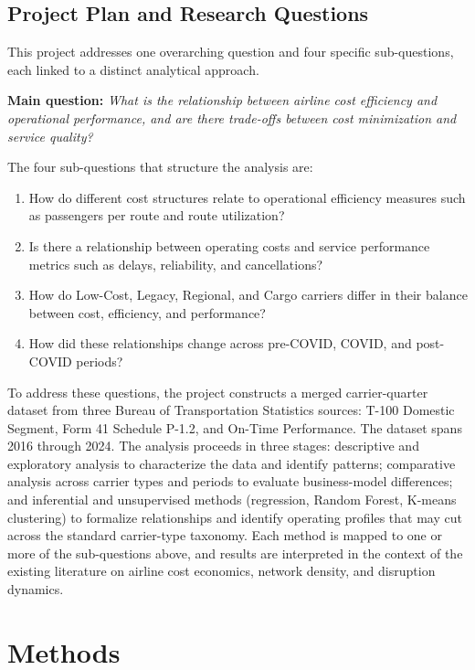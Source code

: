 \documentclass[11pt, letterpaper]{article}
\begin{document}
\subsection{Project Plan and Research Questions}
This project addresses one overarching question and four specific sub-questions, each linked to a distinct analytical approach.

\textbf{Main question:} \textit{What is the relationship between airline cost efficiency and operational performance, and are there trade-offs between cost minimization and service quality?}

The four sub-questions that structure the analysis are:
\begin{enumerate}
    \item How do different cost structures relate to operational efficiency measures such as passengers per route and route utilization?
    \item Is there a relationship between operating costs and service performance metrics such as delays, reliability, and cancellations?
    \item How do Low-Cost, Legacy, Regional, and Cargo carriers differ in their balance between cost, efficiency, and performance?
    \item How did these relationships change across pre-COVID, COVID, and post-COVID periods?
\end{enumerate}

To address these questions, the project constructs a merged carrier-quarter dataset from three Bureau of Transportation Statistics sources: T-100 Domestic Segment, Form 41 Schedule P-1.2, and On-Time Performance. The dataset spans 2016 through 2024. The analysis proceeds in three stages: descriptive and exploratory analysis to characterize the data and identify patterns; comparative analysis across carrier types and periods to evaluate business-model differences; and inferential and unsupervised methods (regression, Random Forest, K-means clustering) to formalize relationships and identify operating profiles that may cut across the standard carrier-type taxonomy. Each method is mapped to one or more of the sub-questions above, and results are interpreted in the context of the existing literature on airline cost economics, network density, and disruption dynamics.

\section{Methods}
\end{document}
